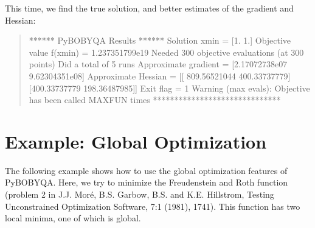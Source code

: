 \documentclass[letterpaper,10pt,english]{sphinxmanual}
\begin{document}
This time, we find the true solution, and better estimates of the gradient and Hessian:
\begin{quote}

\begin{sphinxVerbatim}[commandchars=\\\{\}]
****** Py\PYGZhy{}BOBYQA Results ******
Solution xmin = [1. 1.]
Objective value f(xmin) = 1.237351799e\PYGZhy{}19
Needed 300 objective evaluations (at 300 points)
Did a total of 5 runs
Approximate gradient = [\PYGZhy{}2.17072738e\PYGZhy{}07  9.62304351e\PYGZhy{}08]
Approximate Hessian = [[ 809.56521044 \PYGZhy{}400.33737779]
 [\PYGZhy{}400.33737779  198.36487985]]
Exit flag = 1
Warning (max evals): Objective has been called MAXFUN times
******************************
\end{sphinxVerbatim}
\end{quote}


\section{Example: Global Optimization}
\label{\detokenize{userguide:example-global-optimization}}
The following example shows how to use the global optimization features of Py\sphinxhyphen{}BOBYQA. Here, we try to minimize the Freudenstein and Roth function (problem 2 in J.J. Moré, B.S. Garbow, B.S. and K.E. Hillstrom, Testing Unconstrained Optimization Software,  7:1 (1981), 17\sphinxhyphen{}41). This function has two local minima, one of which is global.
\end{document}

